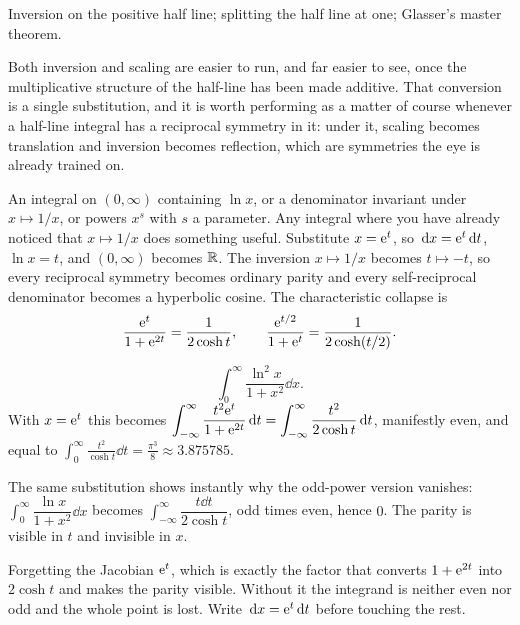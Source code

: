 \begin{seealsob}Inversion on the positive half line; splitting the half line at one; Glasser's master theorem.\end{seealsob}

Both inversion and scaling are easier to run, and far easier to see, once the multiplicative structure of the half-line has been made additive. That conversion is a single substitution, and it is worth performing as a matter of course whenever a half-line integral has a reciprocal symmetry in it: under it, scaling becomes translation and inversion becomes reflection, which are symmetries the eye is already trained on.

\cue An integral on $(0,\infty)$ containing $\ln x$, or a denominator invariant under $x\mapsto1/x$, or powers $x^{s}$ with $s$ a parameter. Any integral where you have already noticed that $x\mapsto1/x$ does something useful.
\method Substitute $x=\mathrm{e}^{t}$, so $\,\mathrm{d} x=\mathrm{e}^{t}\,\mathrm{d} t$, $\ln x=t$, and $(0,\infty)$ becomes $\mathbb{R}$. The inversion $x\mapsto1/x$ becomes $t\mapsto-t$, so every reciprocal symmetry becomes ordinary parity and every self-reciprocal denominator becomes a hyperbolic cosine. The characteristic collapse is
\[\frac{\mathrm{e}^{t}}{1+\mathrm{e}^{2t}}=\frac{1}{2\cosh t},\qquad \frac{\mathrm{e}^{t/2}}{1+\mathrm{e}^{t}}=\frac{1}{2\cosh(t/2)}.\]

\begin{worked}
\[\int_0^{\infty}\frac{\ln^{2}x}{1+x^{2}}\dd x.\]
With $x=\mathrm{e}^{t}$ this becomes $\displaystyle\int_{-\infty}^{\infty}\frac{t^{2}\mathrm{e}^{t}}{1+\mathrm{e}^{2t}}\,\mathrm{d} t=\int_{-\infty}^{\infty}\frac{t^{2}}{2\cosh t}\,\mathrm{d} t$, manifestly even, and equal to $\displaystyle\int_0^{\infty}\frac{t^{2}}{\cosh t}\dd t=\frac{\pi^{3}}{8}\approx3.875785$.

The same substitution shows instantly why the odd-power version vanishes: $\int_0^{\infty}\dfrac{\ln x}{1+x^{2}}\dd x$ becomes $\int_{-\infty}^{\infty}\dfrac{t\dd t}{2\cosh t}$, odd times even, hence $0$. The parity is visible in $t$ and invisible in $x$.
\end{worked}

\begin{trap}
Forgetting the Jacobian $\mathrm{e}^{t}$, which is exactly the factor that converts $1+\mathrm{e}^{2t}$ into $2\cosh t$ and makes the parity visible. Without it the integrand is neither even nor odd and the whole point is lost. Write $\,\mathrm{d} x=\mathrm{e}^{t}\,\mathrm{d} t$ before touching the rest.
\end{trap}

